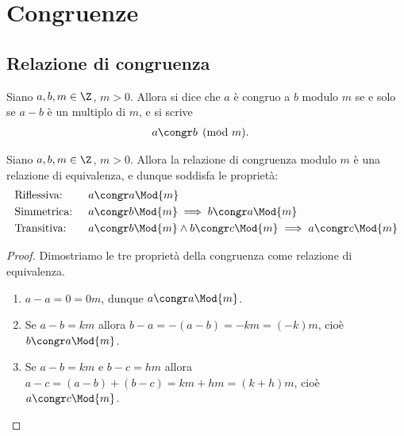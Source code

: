 \chapter{Congruenze}

\section{Relazione di congruenza}

\begin{definition} \label{def_congr}
    Siano $a, b, m \in \Z$, $m > 0$. Allora si dice che $a$ è congruo a $b$ modulo $m$ se e solo se $a - b$ è un multiplo di $m$, e si scrive
    \begin{align*}
        &a \congr b \pmod m.
    \end{align*}
\end{definition}

\begin{theorem} 
    Siano $a, b, m \in \Z$, $m > 0$. Allora la relazione di congruenza modulo $m$ è una relazione di equivalenza, e dunque soddisfa le proprietà:
    \begin{align}
        &\text{Riflessiva: } &&a \congr a \Mod{m} \label{congr_rifl}\\
        &\text{Simmetrica: } &&a \congr b \Mod{m} \implies b \congr a \Mod{m} \label{congr_simm}\\
        &\text{Transitiva: } &&a \congr b \Mod{m} \land b \congr c \Mod{m} \implies a \congr c \Mod{m}  \label{congr_trans}
    \end{align}
\end{theorem}
\begin{proof} Dimostriamo le tre proprietà della congruenza come relazione di equivalenza.
    \begin{enumerate}
        \item $a - a = 0 = 0m$, dunque $a \congr a \Mod{m}$.
        \item Se $a - b = km$ allora $b - a = -(a - b) = -km = (-k)m$, cioè $b \congr a \Mod{m}$.
        \item Se $a - b = km$ e $b - c = hm$ allora $a - c = (a - b) + (b - c) = km + hm = (k + h)m$, 
            cioè $a \congr c \Mod{m}$. \qedhere
    \end{enumerate}
\end{proof}

